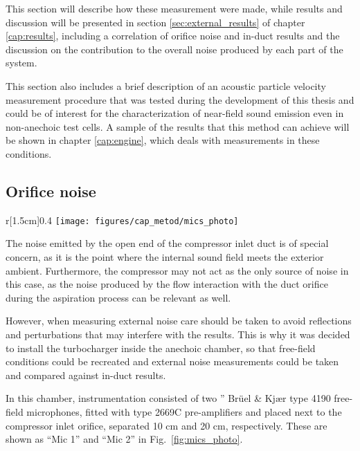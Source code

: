 This section will describe how these measurement were made, while results and discussion will be presented in section \ref{sec:external_results} of chapter \ref{cap:results}, including a correlation of orifice noise and in-duct results and the discussion on the contribution to the overall noise produced by each part of the system.

This section also includes a brief description of an acoustic particle velocity measurement procedure that was tested during the development of this thesis and could be of interest for the characterization of near-field sound emission even in non-anechoic test cells. A sample of the results that this method can achieve will be shown in chapter \ref{cap:engine}, which deals with measurements in these conditions.

\subsection{Orifice noise}
\label{sub:metod_orifice_noise}

\begin{wrapfigure}[19]{r}[1.5cm]{0.4\textwidth}
\centering
\vspace{-4mm}
\texttt{[image: figures/cap\_metod/mics\_photo]}
\caption[Image of the orifice free-field microphones]{Image of the two free-field microphones placed at 10 mm (Mic 1) and 20 mm (Mic 2) from the orifice of the compressor inlet duct.}
\label{fig:mics_photo}
\end{wrapfigure}

The noise emitted by the open end of the compressor inlet duct is of special concern, as it is the point where the internal sound field meets the exterior ambient. Furthermore, the compressor may not act as the only source of noise in this case, as the noise produced by the flow interaction with the duct orifice during the aspiration process can be relevant as well.

However, when measuring external noise care should be taken to avoid reflections and perturbations that may interfere with the results. This is why it was decided to install the turbocharger inside the anechoic chamber, so that free-field conditions could be recreated and external noise measurements could be taken and compared against in-duct results.

In this chamber, instrumentation consisted of two '' Brüel \& Kjær type 4190 free-field microphones, fitted with type 2669C pre-amplifiers and placed next to the compressor inlet orifice, separated 10 cm and 20 cm, respectively. These are shown as ``Mic 1'' and ``Mic 2'' in Fig.~\ref{fig:mics_photo}.

